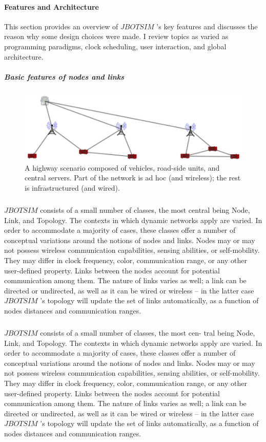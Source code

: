 \paragraph{Features and Architecture}This section provides an overview of  $JBOTSIM$ ’s key features and discusses the reason why some design choices were made. I review topics as varied as programming paradigms, clock scheduling, user interaction, and global architecture.
\newpage
\subparagraph{Basic features of nodes and links} 
\begin{figure}[h!]
	\centering
	\includegraphics[width=0.7\linewidth]{fig_2}
	\caption[A highway scenario composed of vehicles, road-side units, and central servers. Part of the network is ad hoc (and wireless); the rest is infrastructured (and wired).]{A highway scenario composed of vehicles, road-side units, and central servers. Part of the network is ad hoc (and wireless); the rest is infrastructured (and wired).}
	\label{fig:fig2}
\end{figure}
\subparagraph{} $JBOTSIM$  consists of a small number of classes, the most central being Node, Link, and Topology. The contexts in which dynamic networks apply are varied. In order to accommodate a majority of cases, these classes offer a number of conceptual variations around the notions of nodes and links. Nodes may or may not possess wireless communication capabilities, sensing abilities, or self-mobility. They may differ in clock frequency, color, communication range, or any other user-defined property. Links between the nodes account for potential communication among them. The nature of links varies as well; a link can be directed or undirected, as well as it can be wired or wireless – in the latter case  $JBOTSIM$ ’s topology will update the set of links automatically, as a function of nodes distances and communication ranges.
\subparagraph{} $JBOTSIM$  consists of a small number of classes, the most cen- tral being Node, Link, and Topology. The contexts in which dynamic networks apply are varied. In order to accommodate a majority of cases, these classes offer a number of conceptual variations around the notions of nodes and links. Nodes may or may not possess wireless communication capabilities, sensing abilities, or self-mobility. They may differ in clock frequency, color, communication range, or any other user-defined property. Links between the nodes account for potential communication among them. The nature of links varies as well; a link can be directed or undirected, as well as it can be wired or wireless – in the latter case  $JBOTSIM$ ’s topology will update the set of links automatically, as a function of nodes distances and communication ranges.
